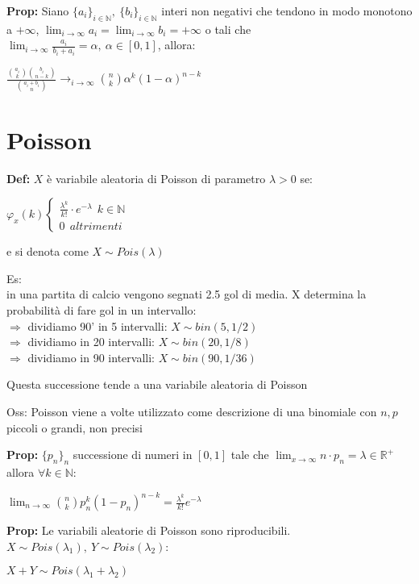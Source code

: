 \documentclass[11pt, letterpaper]{article}
\begin{document}
\newpage
\thispagestyle{fancy}

\textbf{Prop:} Siano $\{a_{i}\}_{i\in\mathbb{N}},\ \{b_{i}\}_{i\in\mathbb{N}}$ interi non negativi che tendono
in modo monotono a $+\infty$, $\lim_{i \to \infty} a_{i}=\lim_{i\to\infty} b_{i}=+\infty$ o tali che \\
$\lim_{i\to\infty} \frac{a_{i}}{b_{i}+a_{i}}= \alpha,\ \alpha\in[0,1]$, allora:
\begin{center}
    $\frac{\binom{a_{i}}{k}\binom{b_{i}}{n-k}}{\binom{a_{i}+b_{i}}{n}} \rightarrow_{i\to\infty}
    \binom{n}{k}\alpha^{k}(1-\alpha)^{n-k}$
\end{center}

\section{Poisson}
\textbf{Def:} $X$ è variabile aleatoria di Poisson di parametro $\lambda >0$ se:
\begin{center}
    $\varphi_{x}(k)\begin{cases}
        \frac{\lambda^{k}}{k!}\cdot e^{-\lambda}\ \ k\in\mathbb{N}\\
        0\ \ altrimenti
    \end{cases}$
\end{center} 
e si denota come $X\sim Pois(\lambda)$

Es:\\
in una partita di calcio vengono segnati 2.5 gol di media. X determina la probabilità di fare gol in un intervallo:\\
$\Rightarrow$ dividiamo 90' in 5 intervalli: $X\sim bin(5,1/2)$\\
$\Rightarrow$ dividiamo in 20 intervalli: $X\sim bin(20,1/8)$\\
$\Rightarrow$ dividiamo in 90 intervalli: $X\sim bin(90,1/36)$

Questa successione tende a una variabile aleatoria di Poisson

Oss: Poisson viene a volte utilizzato come descrizione di una binomiale con $n,p$ piccoli o grandi, non precisi

\textbf{Prop:} $\{p_{n}\}_{n}$ successione di numeri in $[0,1]$ tale che $\lim_{x\to\infty}n\cdot p_{n}=
\lambda\in\mathbb{R}^{+}$ allora $\forall k\in\mathbb{N}$:
\begin{center}
    $\lim_{n\to\infty} \binom{n}{k}p_{n}^{k}(1-p_{n})^{n-k}=\frac{\lambda^{k}}{k!}e^{-\lambda}$
\end{center}

\newpage
\textbf{Prop:} Le variabili aleatorie di Poisson sono riproducibili. 
$X\sim Pois(\lambda_{1}),\ Y\sim Pois(\lambda_{2})$:
\begin{center}
    $X+Y\sim Pois(\lambda_{1}+\lambda_{2})$
\end{center}
\end{document}
